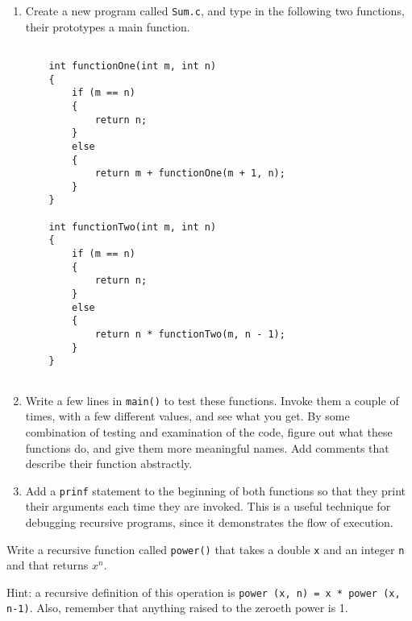 \begin{exercise}
\begin{enumerate}


\item Create a new program called {\tt Sum.c},
and type in the following two functions, their prototypes a main function.

\begin{verbatim}

    int functionOne(int m, int n) 
    {
        if (m == n) 
        {
            return n;
        } 
        else 
        {
            return m + functionOne(m + 1, n);
        }
    }
    
    int functionTwo(int m, int n) 
    {
        if (m == n) 
        {
            return n;
        } 
        else 
        {
            return n * functionTwo(m, n - 1);
        }
    }
    
\end{verbatim}
%
\item Write a few lines in {\tt main()} to test these functions.
Invoke them a couple of times, with a few different values,
and see what you get.  By some combination of testing and
examination of the code, figure out what these functions do,
and give them more meaningful names.  Add comments that
describe their function abstractly.

\item Add a {\tt prinf} statement to the beginning of both
functions so that they print their arguments each time they are
invoked.  This is a useful technique for debugging recursive
programs, since it demonstrates the flow of execution.

\end{enumerate}
\end{exercise}

\begin{exercise}
\label{ex.power}
Write a recursive function called {\tt power()} that
takes a double {\tt x} and an integer {\tt n} and that
returns $x^n$.  

Hint: a recursive definition of this
operation is {\tt power (x, n) = x * power (x, n-1)}.
Also, remember that anything raised to the zeroeth power
is 1.
\end{exercise}


%

